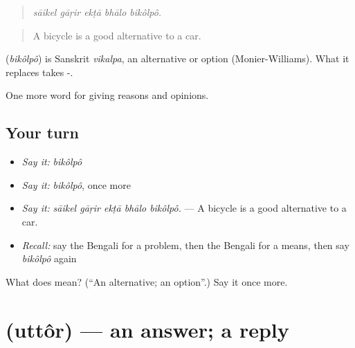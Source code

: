 \begin{quote}
    
\end{quote}

\begin{quote}
\emph{sāikel gāṛir ekṭā bhālo bikôlpô.}
\end{quote}

\begin{quote}
A bicycle is a good alternative to a car.
\end{quote}

\begin{cousinweb}
\textbf{} (\emph{bikôlpô}) is Sanskrit \emph{vikalpa}, an alternative or option (Monier-Williams). What it replaces takes -.
\end{cousinweb}

\begin{grammarlens}[title={What you've built}]
One more word for giving reasons and opinions.
\end{grammarlens}

\subsection*{Your turn}
\begin{itemize}
\raggedright
  \item \emph{Say it:} \emph{bikôlpô}
  \item \emph{Say it:} \emph{bikôlpô}, once more
  \item \emph{Say it:} \emph{sāikel gāṛir ekṭā bhālo bikôlpô.} — A bicycle is a good alternative to a car.
  \item \emph{Recall:} say the Bengali for a problem, then the Bengali for a means, then say \emph{bikôlpô} again
\end{itemize}

\begin{tcolorbox}[breakable,colback=teal!4,colframe=teal!35!black,title={Before you move on}]
What does  mean? (\textquotedblleft{}An alternative; an option\textquotedblright{}.) Say it once more.
\end{tcolorbox}
\section[\texorpdfstring{\bn{উত্তর} (uttôr)}{উত্তর (uttôr)}]{ (uttôr) — an answer; a reply}

\label{lesson:BN-C363-uttor}



